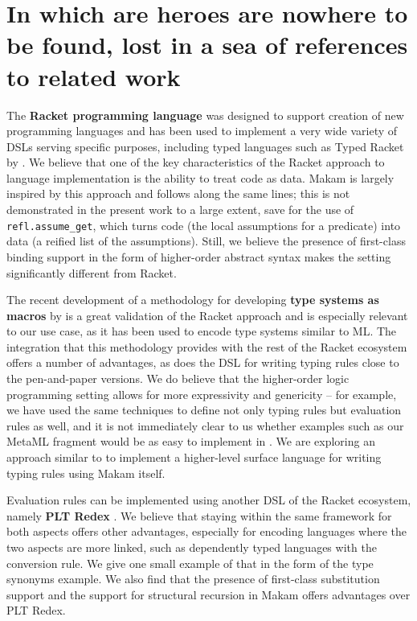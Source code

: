 \section{In which are heroes are nowhere to be found, lost in a sea of
references to related
work}\label{in-which-are-heroes-are-nowhere-to-be-found-lost-in-a-sea-of-references-to-related-work}

\identNormal

The \textbf{Racket programming language} was designed to support
creation of new programming languages \citep{racket-manifesto} and has
been used to implement a very wide variety of DSLs serving specific
purposes, including typed languages such as Typed Racket by
\citet{typed-racket-main-reference}. We believe that one of the key
characteristics of the Racket approach to language implementation is the
ability to treat code as data. Makam is largely inspired by this
approach and follows along the same lines; this is not demonstrated in
the present work to a large extent, save for the use of
\texttt{refl.assume\_get}, which turns code (the local assumptions for a
predicate) into data (a reified list of the assumptions). Still, we
believe the presence of first-class binding support in the form of
higher-order abstract syntax makes the \lamprolog setting significantly
different from Racket.

The recent development of a methodology for developing \textbf{type
systems as macros} by \citet{racket-type-systems-as-macros} is a great
validation of the Racket approach and is especially relevant to our use
case, as it has been used to encode type systems similar to ML. The
integration that this methodology provides with the rest of the Racket
ecosystem offers a number of advantages, as does the
 DSL for writing typing rules close to the
pen-and-paper versions. We do believe that the higher-order logic
programming setting allows for more expressivity and genericity -- for
example, we have used the same techniques to define not only typing
rules but evaluation rules as well, and it is not immediately clear to
us whether examples such as our MetaML fragment would be as easy to
implement in . We are exploring an approach similar
to  to implement a higher-level surface language for
writing typing rules using Makam itself.

Evaluation rules can be implemented using another DSL of the Racket
ecosystem, namely \textbf{PLT Redex} \citep{felleisen2009semantics}. We
believe that staying within the same framework for both aspects offers
other advantages, especially for encoding languages where the two
aspects are more linked, such as dependently typed languages with the
conversion rule. We give one small example of that in the form of the
type synonyms example. We also find that the presence of first-class
substitution support and the support for structural recursion in Makam
offers advantages over PLT Redex.

